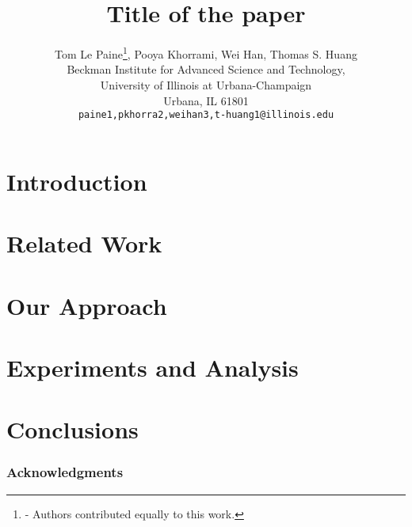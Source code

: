 \documentclass{article} %
\title{Title of the paper}
\author{
Tom Le Paine\thanks{ - Authors contributed equally to this work.}, Pooya Khorrami\samethanks, Wei Han, Thomas S. Huang \\
Beckman Institute for Advanced Science and Technology,\\
University of Illinois at Urbana-Champaign\\
Urbana, IL 61801\\
\texttt{{paine1,pkhorra2,weihan3,t-huang1}@illinois.edu} \\
}
\begin{document}
\maketitle



\section{Introduction}
\label{sec:intro}


\section{Related Work}
\label{sec:related_work}


\section{Our Approach}
\label{sec:method}


\section{Experiments and Analysis}
\label{sec:experiments}


\section{Conclusions}
\label{sec:conclusions}


\subsubsection*{Acknowledgments}
\label{sec:conclusions}




\end{document}
